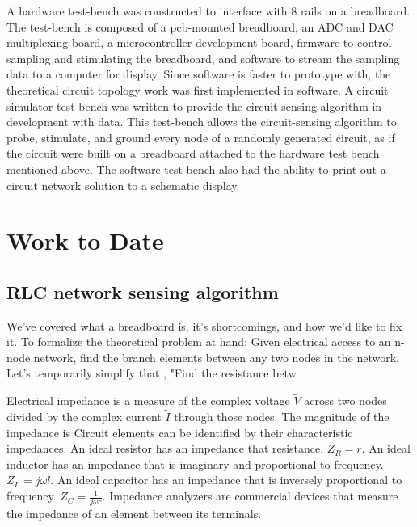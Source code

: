 \documentclass[11pt, a4paper]{article}
\begin{document}
A hardware test-bench was constructed to interface with 8 rails on a breadboard.
The test-bench is composed of a pcb-mounted breadboard, an ADC and DAC multiplexing board, a microcontroller development board, firmware to control sampling and stimulating the breadboard, and software to stream the sampling data to a computer for display.
Since software is faster to prototype with, the theoretical circuit topology work was first implemented in software.
A circuit simulator test-bench was written to provide the circuit-sensing algorithm in development with data.
This test-bench allows the circuit-sensing algorithm to probe, stimulate, and ground every node of a randomly generated circuit, as if the circuit were built on a breadboard attached to the hardware test bench mentioned above.
The software test-bench also had the ability to print out a circuit network solution to a schematic display.

\section{Work to Date}

\subsection{RLC network sensing algorithm}

We've covered what a breadboard is, it's shortcomings, and how we'd like to fix it.
To formalize the theoretical problem at hand:
Given electrical access to an n-node network, find the branch elements between any two nodes in the network.
Let's temporarily simplify that , "Find the resistance betw

Electrical impedance is a measure of the complex voltage $\tilde{V}$ across two nodes divided by the complex current $\tilde{I}$ through those nodes.
The magnitude of the impedance is
Circuit elements can be identified by their characteristic impedances.
An ideal resistor has an impedance that resistance.
$Z_R=r$.
An ideal inductor has an impedance that is imaginary and proportional to frequency.
$Z_L=j\omega l$.
An ideal capacitor has an impedance that is inversely proportional to frequency.
$Z_C=\frac{1}{j \omega c}$.
Impedance analyzers are commercial devices that measure the impedance of an element between its terminals.
\end{document}
